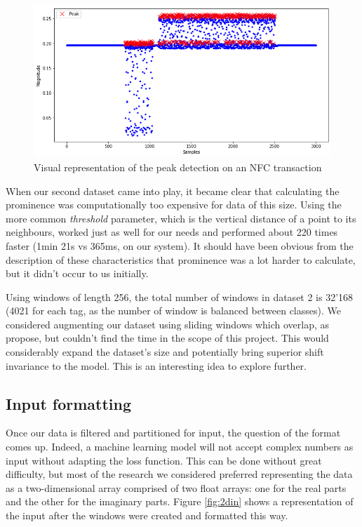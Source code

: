 \begin{figure}[htbp!]
  \centering
  \includegraphics[scale=0.55]{figures/dataprep_peaks.png}
  \caption{Visual representation of the peak detection on an NFC transaction}
  \label{fig:peaks}
\end{figure}

When our second dataset came into play, it became clear that calculating the prominence was computationally too expensive for data of this size. Using the more common \textit{threshold} parameter, which is the vertical distance of a point to its neighbours, worked just as well for our needs and performed about 220 times faster (1min 21s vs 365ms, on our system). It should have been obvious from the description of these characteristics that prominence was a lot harder to calculate, but it didn't occur to us initially.

Using windows of length 256, the total number of windows in dataset 2 is 32'168 (4021 for each tag, as the number of window is balanced between classes). We considered augmenting our dataset using sliding windows which overlap, as \textcite{riyaz_deep_2018} propose, but couldn't find the time in the scope of this project. This would considerably expand the dataset's size and potentially bring superior shift invariance to the model. This is an interesting idea to explore further.

\newpage
\subsection{Input formatting}

Once our data is filtered and partitioned for input, the question of the format comes up. Indeed, a machine learning model will not accept complex numbers as input without adapting the loss function. This can be done without great difficulty, but most of the research we considered preferred representing the data as a two-dimensional array comprised of two float arrays: one for the real parts and the other for the imaginary parts. Figure \ref{fig:2din} shows a representation of the input after the windows were created and formatted this way.

